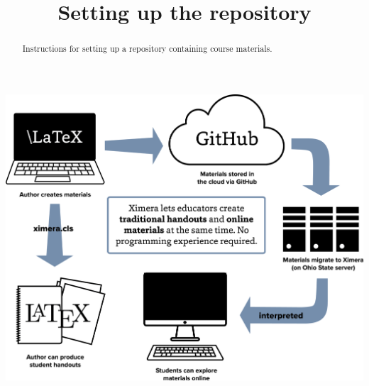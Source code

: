 \documentclass{ximera}
\title{Setting up the repository}
\begin{document}
\begin{abstract}
Instructions for setting up a repository containing course materials.
\end{abstract}
\maketitle


\begin{image}
\includegraphics{XimeraGraphic.png}
\end{image}
\end{document}
